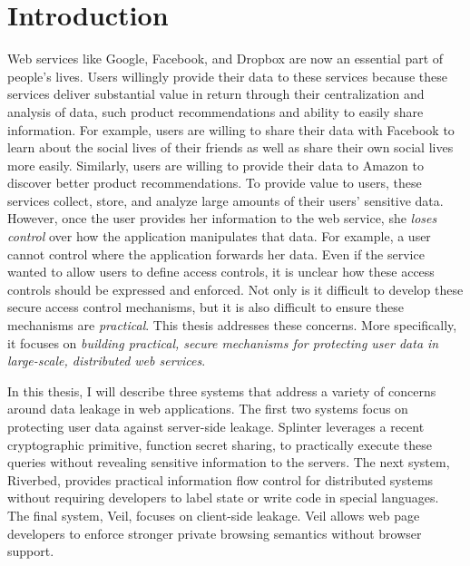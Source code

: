\section{Introduction}

Web services like Google, Facebook, and Dropbox are now an essential part of people’s lives. Users
willingly provide their data to these services because these services deliver substantial value in return
through their centralization and analysis of data, such product recommendations and ability to easily
share information. For example, users are willing to share their data with Facebook to learn
about the social lives of their friends as well as share their own social lives more easily.
Similarly, users are willing to provide their data to Amazon to discover
better product recommendations.
To provide value to users, 
these services collect, store, and analyze large 
amounts of their users' sensitive data. However,
once the user provides her information to the web service,
she \textit{loses control} over how the application manipulates
that data. For example, a user cannot control where the application
forwards her data. Even if the service wanted to allow users to 
define access controls, it is unclear how these access controls
should be expressed and enforced. Not only is it difficult to develop
these secure access control mechanisms, but it is also difficult to ensure
these mechanisms are \textit{practical}. 
This thesis addresses these concerns.
More specifically, it focuses on \textit{building practical, secure 
mechanisms for protecting user data in large-scale, distributed web services}.

In this thesis, I will describe three systems that address a variety
of concerns around data leakage in web applications. The first two
systems focus on protecting user data against server-side leakage.  
Splinter leverages a recent cryptographic
primitive, function secret sharing, to practically
execute these queries without revealing sensitive information to the servers.
The next system, Riverbed, 
provides practical information flow control for distributed systems without
requiring developers to label state or write code in special languages.
The final system, Veil, focuses on client-side leakage. 
Veil allows web page developers to enforce stronger private browsing semantics without
browser support.